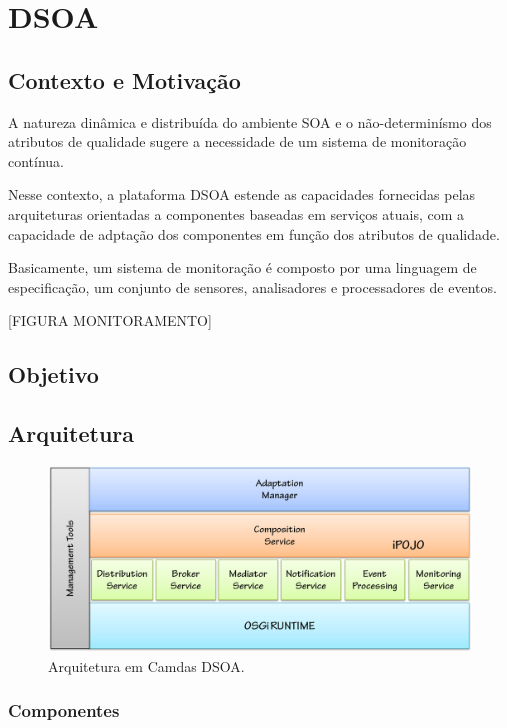 \chapter{DSOA}
\label{ch:3}

\section{Contexto e Motivação}



A natureza dinâmica e distribuída do ambiente SOA e o não-determinísmo dos atributos de qualidade sugere a necessidade de um sistema de monitoração contínua.

Nesse contexto, a plataforma DSOA estende as capacidades fornecidas pelas arquiteturas orientadas a componentes baseadas em serviços atuais, com a capacidade de adptação dos componentes em função dos atributos de qualidade.

Basicamente, um sistema de monitoração é composto por uma linguagem de especificação, um conjunto de sensores, analisadores e processadores de eventos.

[FIGURA MONITORAMENTO]



\section{Objetivo}

\section{Arquitetura}
\label{sec:dsoa_arch}

\begin{figure}[htp]
\centering
\includegraphics[width=13cm]{chapters/chapter3/dsoa-arch.png}
\caption[Arquitetura em Camdas DSOA]{Arquitetura em Camdas DSOA.}
\label{fig:proposal}
\end{figure}

\subsection{Componentes}
